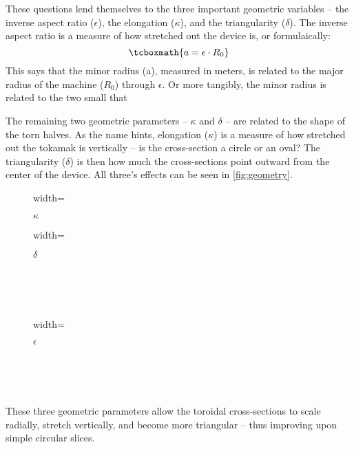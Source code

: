 These questions lend themselves to the three important geometric variables -- the inverse aspect ratio ($\epsilon$), the elongation ($\kappa$), and the triangularity ($\delta$). The inverse aspect ratio is a measure of how stretched out the device is, or formulaically:
\begin{equation}
	\label{eq:a}
	\tcboxmath{
	a = \epsilon \cdot R_0
	}
	\myequations{Minor Radius -- $a$}
\end{equation}
This says that the minor radius (a), measured in meters, is related to the major radius of the machine ($R_0$) through $\epsilon$. Or more tangibly, the minor radius is related to the two small  that  

The remaining two geometric parameters -- $\kappa$ and $\delta$ -- are related to the shape of the torn halves. As the name hints, elongation ($\kappa$) is a measure of how stretched out the tokamak is vertically -- is the cross-section a circle or an oval? The triangularity ($\delta$) is then how much the cross-sections point outward from the center of the device. All three's effects can be seen in \cref{fig:geometry}. 

\begin{figure*}[h]
    \centering
    \hfill 
    \begin{subfigure}[t]{0.45\textwidth}
        \centering
		\begin{adjustbox}{width=\textwidth}
			\Large
			
		\end{adjustbox}
        \caption{$\kappa$}
    \end{subfigure}
    \hfill
    \begin{subfigure}[t]{0.45\textwidth}
        \centering
		\begin{adjustbox}{width=\textwidth}
			\Large
			
		\end{adjustbox}
        \caption{$\delta$}
    \end{subfigure}
    \hfill \hfill ~\\ ~\\ ~\\
    \begin{subfigure}[t]{0.6\textwidth}
        \centering
		\begin{adjustbox}{width=\textwidth}
			\large
			
		\end{adjustbox}
        \caption{$\epsilon$}
    \end{subfigure} ~\\ ~\\
    \caption{Geometric Parameters} ~\\
    \small These three geometric parameters allow the toroidal cross-sections to scale radially, stretch vertically, and become more triangular -- thus improving upon simple circular slices.
    \label{fig:geometry}
\end{figure*}

